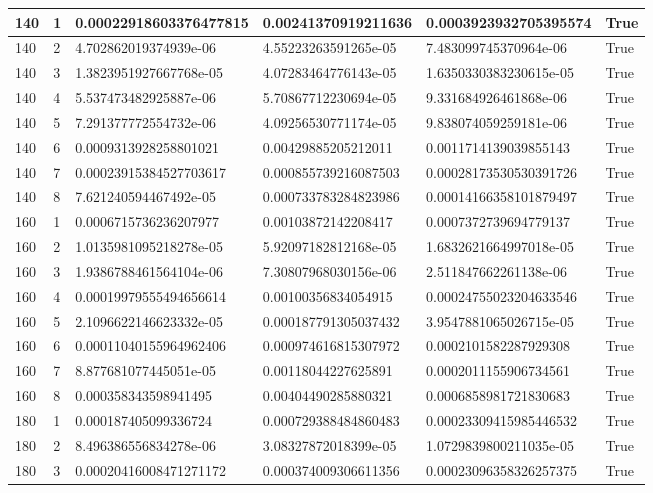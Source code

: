 \documentclass[a4paper, 12pt]{report}
\def\tabsize{4.4cm}
\def\stabsize{0.97cm}
\def\mtabsize{0.73cm}
\begin{document}
\begin{center}
\begin{longtable}{|m{\stabsize}|m{\stabsize}|m{\tabsize}|m{\tabsize}|m{\tabsize}|m{\mtabsize}|}
140 & 1 & 0.00022918603376477815 & 0.00241370919211636 & 0.0003923932705395574 & True \\ \hline  
140 & 2 & 4.702862019374939e-06 & 4.55223263591265e-05 & 7.483099745370964e-06 & True \\ \hline  
140 & 3 & 1.3823951927667768e-05 & 4.07283464776143e-05 & 1.6350330383230615e-05 & True \\ \hline  
140 & 4 & 5.537473482925887e-06 & 5.70867712230694e-05 & 9.331684926461868e-06 & True \\ \hline  
140 & 5 & 7.291377772554732e-06 & 4.09256530771174e-05 & 9.838074059259181e-06 & True \\ \hline  
140 & 6 & 0.0009313928258801021 & 0.00429885205212011 & 0.0011714139039855143 & True \\ \hline  
140 & 7 & 0.00023915384527703617 & 0.000855739216087503 & 0.00028173530530391726 & True \\ \hline  
140 & 8 & 7.621240594467492e-05 & 0.000733783284823986 & 0.00014166358101879497 & True \\ \hline  
160 & 1 & 0.0006715736236207977 & 0.00103872142208417 & 0.0007372739694779137 & True \\ \hline  
160 & 2 & 1.0135981095218278e-05 & 5.92097182812168e-05 & 1.6832621664997018e-05 & True \\ \hline  
160 & 3 & 1.9386788461564104e-06 & 7.30807968030156e-06 & 2.511847662261138e-06 & True \\ \hline  
160 & 4 & 0.00019979555494656614 & 0.00100356834054915 & 0.00024755023204633546 & True \\ \hline  
160 & 5 & 2.1096622146623332e-05 & 0.000187791305037432 & 3.9547881065026715e-05 & True \\ \hline  
160 & 6 & 0.00011040155964962406 & 0.000974616815307972 & 0.0002101582287929308 & True \\ \hline  
160 & 7 & 8.877681077445051e-05 & 0.00118044227625891 & 0.0002011155906734561 & True \\ \hline  
160 & 8 & 0.000358343598941495 & 0.00404490285880321 & 0.0006858981721830683 & True \\ \hline  
180 & 1 & 0.000187405099336724 & 0.000729388484860483 & 0.00023309415985446532 & True \\ \hline  
180 & 2 & 8.496386556834278e-06 & 3.08327872018399e-05 & 1.0729839800211035e-05 & True \\ \hline  
180 & 3 & 0.00020416008471271172 & 0.000374009306611356 & 0.00023096358326257375 & True \\ \hline  

\end{longtable}
\end{center}
\end{document}
